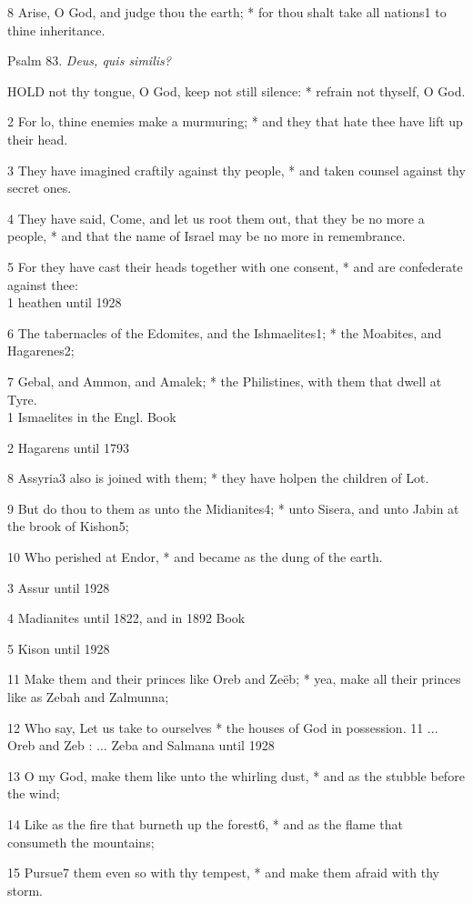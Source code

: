 8 Arise, O God, and judge thou the earth; * for thou shalt take all nations1
to thine inheritance.

Psalm
83. \emph{Deus, quis similis?}

HOLD
not thy tongue, O God, keep not still silence: * refrain not thyself,
O God.

2 For lo, thine enemies make a murmuring; * and they
that hate thee have lift up their head.

3 They have imagined craftily against thy people, *
and taken counsel against thy secret ones.

4 They have said, Come, and let us root them out, that
they be no more a people, * and that the name of Israel may be no more
in remembrance.

5 For they have cast their heads together with one
consent, * and are confederate against thee: \\
1 heathen
until 1928

6 The tabernacles of the Edomites, and the Ishmaelites1; * the
Moabites, and Hagarenes2;

7 Gebal, and Ammon, and Amalek; * the Philistines, with
them that dwell at Tyre. \\
1 Ismaelites in
the Engl. Book

2 Hagarens
until 1793

8 Assyria3 also is joined with them; * they have holpen the children
of Lot.

9 But do thou to them as unto the Midianites4;
* unto Sisera, and unto Jabin at the brook of Kishon5;

10 Who perished at Endor, * and became as the dung of
the earth.

3 Assur
until 1928

4 Madianites
until 1822, and in 1892 Book

5 Kison
until 1928

11 Make them and their princes like Oreb and Zeëb; * yea, make all
their princes like as Zebah and Zalmunna;

12 Who say, Let us take to ourselves * the houses of
God in possession. 11 ... Oreb and Zeb : ...
Zeba and Salmana
until 1928

13 O my God, make them like unto the whirling dust, * and as the stubble
before the wind;

14 Like as the fire that burneth up the forest6,
* and as the flame that consumeth the mountains;

15 Pursue7 them even so with thy tempest,
* and make them afraid with thy storm.

